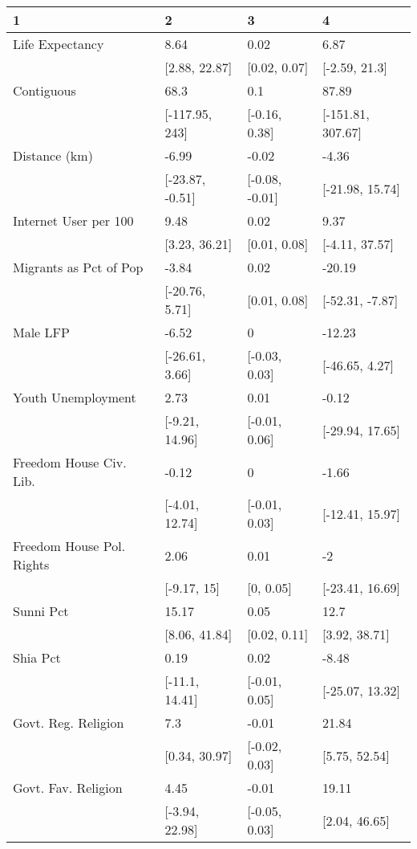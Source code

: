 \begin{table}[ht]
\centering
\begin{tabular}{llll}
  \hline
1 & 2 & 3 & 4 \\ 
  \hline
Life Expectancy & 8.64 & 0.02 & 6.87 \\ 
   & [2.88, 22.87] & [0.02, 0.07] & [-2.59, 21.3] \\ 
  Contiguous & 68.3 & 0.1 & 87.89 \\ 
   & [-117.95, 243] & [-0.16, 0.38] & [-151.81, 307.67] \\ 
  Distance (km) & -6.99 & -0.02 & -4.36 \\ 
   & [-23.87, -0.51] & [-0.08, -0.01] & [-21.98, 15.74] \\ 
  Internet User per 100 & 9.48 & 0.02 & 9.37 \\ 
   & [3.23, 36.21] & [0.01, 0.08] & [-4.11, 37.57] \\ 
  Migrants as Pct of Pop & -3.84 & 0.02 & -20.19 \\ 
   & [-20.76, 5.71] & [0.01, 0.08] & [-52.31, -7.87] \\ 
  Male LFP & -6.52 & 0 & -12.23 \\ 
   & [-26.61, 3.66] & [-0.03, 0.03] & [-46.65, 4.27] \\ 
  Youth Unemployment & 2.73 & 0.01 & -0.12 \\ 
   & [-9.21, 14.96] & [-0.01, 0.06] & [-29.94, 17.65] \\ 
  Freedom House Civ. Lib. & -0.12 & 0 & -1.66 \\ 
   & [-4.01, 12.74] & [-0.01, 0.03] & [-12.41, 15.97] \\ 
  Freedom House Pol. Rights & 2.06 & 0.01 & -2 \\ 
   & [-9.17, 15] & [0, 0.05] & [-23.41, 16.69] \\ 
  Sunni Pct & 15.17 & 0.05 & 12.7 \\ 
   & [8.06, 41.84] & [0.02, 0.11] & [3.92, 38.71] \\ 
  Shia Pct & 0.19 & 0.02 & -8.48 \\ 
   & [-11.1, 14.41] & [-0.01, 0.05] & [-25.07, 13.32] \\ 
  Govt. Reg. Religion & 7.3 & -0.01 & 21.84 \\ 
   & [0.34, 30.97] & [-0.02, 0.03] & [5.75, 52.54] \\ 
  Govt. Fav. Religion & 4.45 & -0.01 & 19.11 \\ 
   & [-3.94, 22.98] & [-0.05, 0.03] & [2.04, 46.65] \\ 

\end{tabular}
\end{table}
